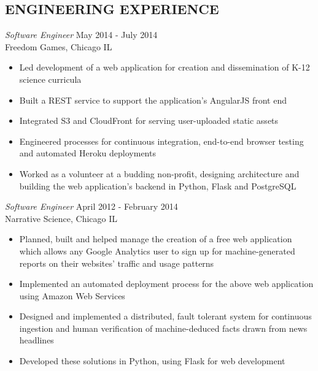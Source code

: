 \documentclass[line,margin]{res}
\begin{document}
\address{waltaskew@gmail.com}
\address{404-819-9796}

\begin{resume}
 
\section{ENGINEERING EXPERIENCE}
        {\sl Software Engineer} \hfill May 2014 - July 2014 \\
        Freedom Games, Chicago IL
        \begin{itemize}
          \item Led development of a web application for creation and
            dissemination of K-12 science curricula
          \item Built a REST service to support the application's AngularJS
            front end
            \item Integrated S3 and CloudFront for serving user-uploaded static
              assets
            \item Engineered processes for continuous integration, end-to-end
              browser testing and automated Heroku deployments
            \item Worked as a volunteer at a budding non-profit, designing
              architecture and building the web application's backend in
              Python, Flask and PostgreSQL
        \end{itemize}

        {\sl Software Engineer} \hfill April 2012 - February 2014 \\
        Narrative Science, Chicago IL
        \begin{itemize} 
          \item Planned, built and helped manage the creation of a
            free web application which allows any Google Analytics
            user to sign up for machine-generated reports on their
            websites' traffic and usage patterns
          \item Implemented an automated deployment process for the
            above web application using Amazon Web Services
          \item Designed and implemented a distributed, fault tolerant
            system for continuous ingestion and human verification of
            machine-deduced facts drawn from news headlines
          \item Developed these solutions in Python, using Flask for
            web development
        \end{itemize}


\end{resume}
\end{document}
